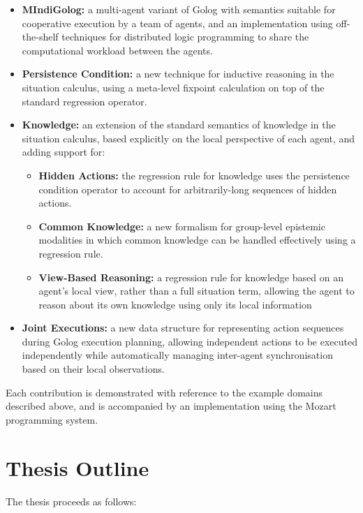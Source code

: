 \begin{itemize}
\item \textbf{MIndiGolog:} a multi-agent variant of Golog with semantics
suitable for cooperative execution by a team of agents, and an implementation
using off-the-shelf techniques for distributed logic programming to
share the computational workload between the agents. 
\item \textbf{Persistence Condition:} a new technique for inductive reasoning
in the situation calculus, using a meta-level fixpoint calculation
on top of the standard regression operator. 
\item \textbf{Knowledge:} an extension of the standard semantics of knowledge
in the situation calculus, based explicitly on the local perspective
of each agent, and adding support for:

\begin{itemize}
\item \textbf{Hidden Actions:} the regression rule for knowledge uses the
persistence condition operator to account for arbitrarily-long sequences
of hidden actions. 
\item \textbf{Common Knowledge:} a new formalism for group-level epistemic
modalities in which common knowledge can be handled effectively using
a regression rule. 
\item \textbf{View-Based Reasoning:} a regression rule for knowledge based
on an agent's local view, rather than a full situation term, allowing
the agent to reason about its own knowledge using only its local information 
\end{itemize}
\item \textbf{Joint Executions:} a new data structure for representing action
sequences during Golog execution planning, allowing independent actions
to be executed independently while automatically managing inter-agent
synchronisation based on their local observations. 
\end{itemize}
Each contribution is demonstrated with reference to the example domains
described above, and is accompanied by an implementation using the
Mozart programming system.


\section{Thesis Outline}

The thesis proceeds as follows:

